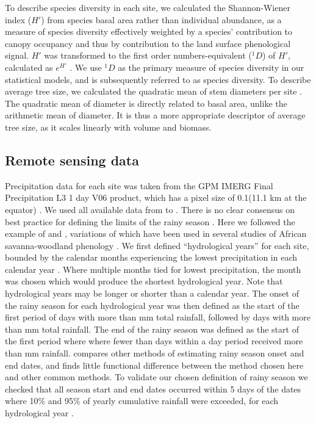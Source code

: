 \documentclass[11pt,a4paper]{article}
\begin{document}
\setlength{\tabcolsep}{2pt} %

\setlength{\tabcolsep}{4pt} %

To describe species diversity in each site, we calculated the Shannon-Wiener index ($H'$) from species basal area rather than individual abundance, as a measure of species diversity effectively weighted by a species' contribution to canopy occupancy and thus by contribution to the land surface phenological signal. $H'$ was transformed to the first order numbers-equivalent ($^1\!D$) of $H'$, calculated as $e^{H'}$ \citep{Jost2007}. We use $^1\!D$ as the primary measure of species diversity in our statistical models, and is subsequently referred to as species diversity. To describe average tree size, we calculated the quadratic mean of stem diameters per site \citep{Curtis2000}. The quadratic mean of diameter is directly related to basal area, unlike the arithmetic mean of diameter. It is thus a more appropriate descriptor of average tree size, as it scales linearly with volume and biomass.

\subsection{Remote sensing data}

Precipitation data for each site was taken from the GPM IMERG Final Precipitation L3 1 day V06 product, which has a pixel size of 0.1\textdegree (11.1 km at the equator) \citep{IMERG}. We used all available data from \modisStart{} to \modisEnd{}. There is no clear consensus on best practice for defining the limits of the rainy season \citep{Guan2014}. Here we followed the example of \citet{Stern1981} and \citet{Adole2018a}, variations of which have been used in several studies of African savanna-woodland phenology \citep{Ryan2017, Tadross2005, Mupangwa2011, Segele2005}. We first defined ``hydrological years'' for each site, bounded by the calendar months experiencing the lowest precipitation in each calendar year \citep{Ferijal2022}. Where multiple months tied for lowest precipitation, the month was chosen which would produce the shortest hydrological year. Note that hydrological years may be longer or shorter than a calendar year. The onset of the rainy season for each hydrological year was then defined as the start of the first period of \onsetPeriodOne{} days with more than \onsetPrecipOne{} mm total rainfall, followed by \onsetPeriodTwo{} days with more than \onsetPrecipTwo{} mm total rainfall. The end of the rainy season was defined as the start of the first period where where fewer than \numberstringnum{\rainyDaysEnd} days within a \periodEnd{} day period received more than \rainyDef{} mm rainfall. \citet{Guan2014} compares other methods of estimating rainy season onset and end dates, and finds little functional difference between the method chosen here and other common methods. To validate our chosen definition of rainy season we checked that all season start and end dates occurred within 5 days of the dates where 10\% and 95\% of yearly cumulative rainfall were exceeded, for each hydrological year \citep{Adole2018a}. 
\end{document}
